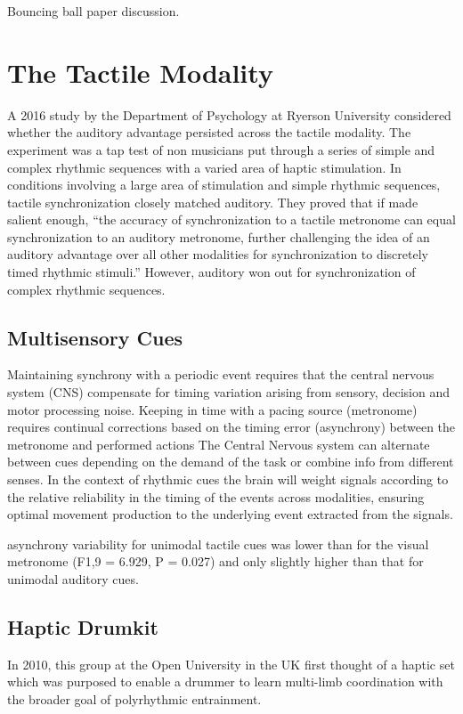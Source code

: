 Bouncing ball paper discussion.

\section{The Tactile Modality} \label{tactileModality}
A 2016 study by the Department of Psychology at Ryerson University considered whether the auditory advantage persisted across the tactile modality. The experiment was a tap test of non musicians put through a series of simple and complex rhythmic sequences with a varied area of haptic stimulation. In conditions involving a large area of stimulation and simple rhythmic sequences, tactile synchronization closely matched auditory. They proved that if made salient enough, “the accuracy of synchronization to a tactile metronome can equal synchronization to an auditory metronome, further challenging the idea of an auditory advantage over all other modalities for synchronization to discretely timed rhythmic stimuli.” However, auditory won out for synchronization of complex rhythmic sequences. ~\cite{ammirante2016synchronizing}

\subsection{Multisensory Cues}
Maintaining synchrony with a periodic event requires that the central nervous system (CNS) compensate for timing variation arising from sensory, decision and motor processing noise. 
Keeping in time with a pacing source (metronome) requires continual corrections based on the timing error (asynchrony) between the metronome and performed actions
The Central Nervous system can alternate between cues depending on the demand of the task or combine info from different senses. In the context of rhythmic cues the brain will weight signals according to the relative reliability in the timing of the events across modalities, ensuring optimal movement production to the underlying event extracted from the signals. 

asynchrony variability for unimodal tactile cues was lower than for the visual metronome (F1,9 = 6.929, P = 0.027) and only slightly higher than that for unimodal auditory cues. \cite{elliott2010multisensory}

\subsection{Haptic Drumkit}
In 2010, this group at the Open University in the UK first thought of a haptic set which was purposed to enable a drummer to learn multi-limb coordination with the broader goal of polyrhythmic entrainment.

